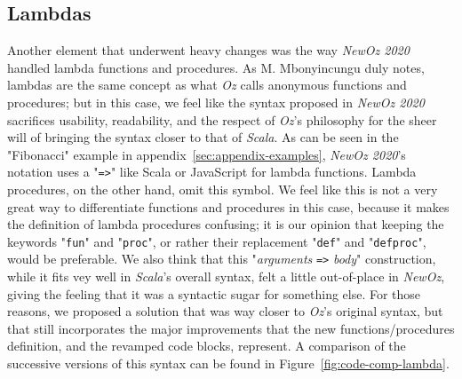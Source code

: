 \subsection{Lambdas}
Another element that underwent heavy changes was the way \textit{NewOz 2020} handled lambda functions and procedures.
As M. Mbonyincungu duly notes, lambdas are the same concept as what \textit{Oz} calls anonymous functions and procedures;
but in this case, we feel like the syntax proposed in \textit{NewOz 2020} sacrifices usability, readability, and the respect of \textit{Oz}'s philosophy for the sheer will of bringing the syntax closer to that of \textit{Scala}.
As can be seen in the "Fibonacci" example in appendix~\ref{sec:appendix-examples}, \textit{NewOz 2020}'s notation uses a "\texttt{=>}" like Scala or JavaScript for lambda functions.
Lambda procedures, on the other hand, omit this symbol.
We feel like this is not a very great way to differentiate functions and procedures in this case, because it makes the definition of lambda procedures confusing;
it is our opinion that keeping the keywords "\texttt{fun}" and "\texttt{proc}", or rather their replacement "\texttt{def}" and "\texttt{defproc}", would be preferable.\newline
We also think that this "\textit{arguments} \texttt{=>} \textit{body}" construction, while it fits vey well in \textit{Scala}'s overall syntax, felt a little out-of-place in \textit{NewOz}, giving the feeling that it was a syntactic sugar for something else.
For those reasons, we proposed a solution that was way closer to \textit{Oz}'s original syntax, but that still incorporates the major improvements that the new functions/procedures definition, and the revamped code blocks, represent.\newline
A comparison of the successive versions of this syntax can be found in Figure~\ref{fig:code-comp-lambda}.
